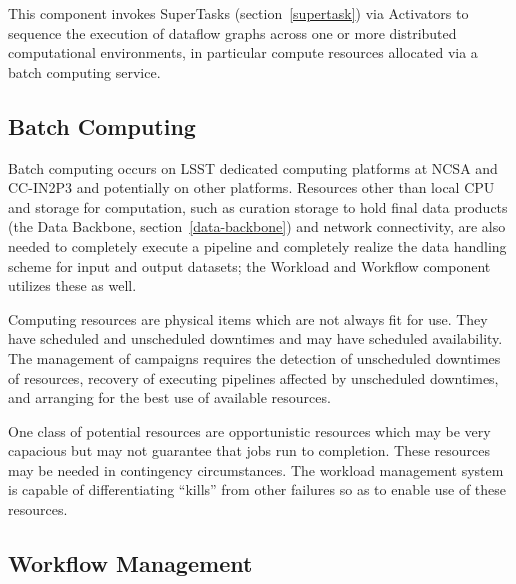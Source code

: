 \documentclass[DM,toc]{lsstdoc}
\begin{document}
This component invokes SuperTasks (section~\ref{supertask}) via Activators to
sequence the execution of dataflow graphs across one or more distributed
computational environments, in particular compute resources allocated via a
batch computing service.

\subsection{Batch Computing}\label{batch-computing}

Batch computing occurs on LSST dedicated computing platforms at NCSA and
CC-IN2P3 and potentially on other platforms. Resources other than local CPU and
storage for computation, such as curation storage to hold final data products
(the Data Backbone, section~\ref{data-backbone}) and network connectivity, are
also needed to completely execute a pipeline and completely realize the data
handling scheme for input and output datasets; the Workload and Workflow
component utilizes these as well.

Computing resources are physical items which are not always fit for use. They
have scheduled and unscheduled downtimes and may have scheduled availability.
The management of campaigns requires the detection of unscheduled downtimes of
resources, recovery of executing pipelines affected by unscheduled downtimes,
and arranging for the best use of available resources.

One class of potential resources are opportunistic resources which may be very
capacious but may not guarantee that jobs run to completion. These resources
may be needed in contingency circumstances. The workload management system is
capable of differentiating ``kills'' from other failures so as to enable use of
these resources.

\subsection{Workflow Management}\label{workflow-management}
\end{document}

